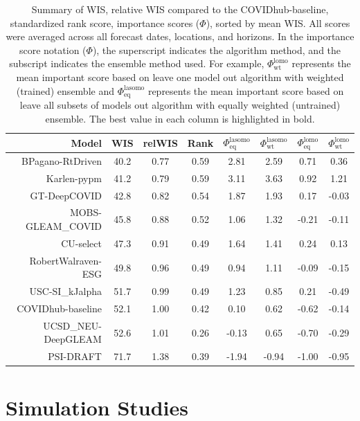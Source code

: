 \documentclass{article}
\theoremstyle{definition}
\begin{document}
\begin{table}[ht]
\centering
\begin{tabular}{|rccccccc|}
  \hline
Model &  WIS & relWIS & Rank & $\Phi^{\text{lasomo}}_{\text{eq}}$ & $\Phi^{\text{lasomo}}_{\text{wt}}$ & $\Phi^{\text{lomo}}_{\text{eq}}$ & $\Phi^{\text{lomo}}_{\text{wt}}$ \\ 
  \hline
BPagano-RtDriven & 40.2 & 0.77 & 0.59 & 2.81 & 2.59 & 0.71 & 0.36 \\ 
  Karlen-pypm & 41.2 & 0.79 & 0.59 & 3.11 & 3.63 & 0.92 & 1.21 \\ 
  GT-DeepCOVID & 42.8 & 0.82 & 0.54 & 1.87 & 1.93 & 0.17 & -0.03 \\ 
  MOBS-GLEAM\_COVID & 45.8 & 0.88 & 0.52 & 1.06 & 1.32 & -0.21 & -0.11 \\ 
  CU-select & 47.3 & 0.91 & 0.49 & 1.64 & 1.41 & 0.24 & 0.13 \\ 
  RobertWalraven-ESG & 49.8 & 0.96 & 0.49 & 0.94 & 1.11 & -0.09 & -0.15 \\ 
  USC-SI\_kJalpha & 51.7 & 0.99 & 0.49 & 1.23 & 0.85 & 0.21 & -0.49 \\ 
  COVIDhub-baseline & 52.1 & 1.00 & 0.42 & 0.10 & 0.62 & -0.62 & -0.14 \\ 
  UCSD\_NEU-DeepGLEAM & 52.6 & 1.01 & 0.26 & -0.13 & 0.65 & -0.70 & -0.29 \\ 
  PSI-DRAFT & 71.7 & 1.38 & 0.39 & -1.94 & -0.94 & -1.00 & -0.95 \\ 
   \hline
\end{tabular}
\caption{Summary of WIS, relative WIS compared to the COVIDhub-baseline, standardized rank score, importance scores ($\Phi$), sorted by mean WIS. All scores were averaged across all forecast dates, locations, and horizons. In the importance score notation ($\Phi$), the superscript indicates the algorithm method, and the subscript indicates the ensemble method used. For example, $\Phi^{\text{lomo}}_{\text{wt}}$ represents the mean important score based on leave one model out algorithm with weighted (trained) ensemble and $\Phi^{\text{lasomo}}_{\text{eq}}$ represents the mean important score based on leave all subsets of models out algorithm with equally weighted (untrained) ensemble.  The best value in each column is highlighted in bold.} 
\end{table}

\section{Simulation Studies} \label{simulation}
\end{document}
